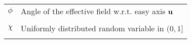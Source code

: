 \begin{longtable}[l]{p{60pt} p{350pt}}


	$\phi$ & Angle of the effective field w.r.t. easy axis $\vb{u}$ \\
	&\\

	$\chi$ & Uniformly distributed random variable in $(0, 1]$ \\
	&\\
\end{longtable}
